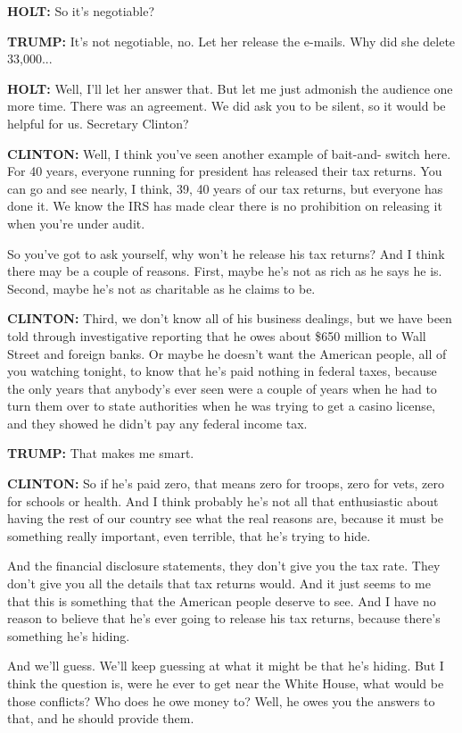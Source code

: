 \textbf{HOLT:} So it's negotiable?

\textbf{TRUMP:} It's not negotiable, no. Let her release the e-mails.
Why did she delete 33,000...

\textbf{HOLT:} Well, I'll let her answer that. But let me just admonish
the audience one more time. There was an agreement. We did ask you to be
silent, so it would be helpful for us. Secretary Clinton?

\textbf{CLINTON:} Well, I think you've seen another example of bait-and-
switch here. For 40 years, everyone running for president has released
their tax returns. You can go and see nearly, I think, 39, 40 years of
our tax returns, but everyone has done it. We know the IRS has made
clear there is no prohibition on releasing it when you're under audit.

So you've got to ask yourself, why won't he release his tax returns? And
I think there may be a couple of reasons. First, maybe he's not as rich
as he says he is. Second, maybe he's not as charitable as he claims to
be.

\textbf{CLINTON:} Third, we don't know all of his business dealings, but
we have been told through investigative reporting that he owes about
\$650 million to Wall Street and foreign banks. Or maybe he doesn't want
the American people, all of you watching tonight, to know that he's paid
nothing in federal taxes, because the only years that anybody's ever
seen were a couple of years when he had to turn them over to state
authorities when he was trying to get a casino license, and they showed
he didn't pay any federal income tax.

\textbf{TRUMP:} That makes me smart.

\textbf{CLINTON:} So if he's paid zero, that means zero for troops, zero
for vets, zero for schools or health. And I think probably he's not all
that enthusiastic about having the rest of our country see what the real
reasons are, because it must be something really important, even
terrible, that he's trying to hide.

And the financial disclosure statements, they don't give you the tax
rate. They don't give you all the details that tax returns would. And it
just seems to me that this is something that the American people deserve
to see. And I have no reason to believe that he's ever going to release
his tax returns, because there's something he's hiding.

And we'll guess. We'll keep guessing at what it might be that he's
hiding. But I think the question is, were he ever to get near the White
House, what would be those conflicts? Who does he owe money to? Well, he
owes you the answers to that, and he should provide them.

